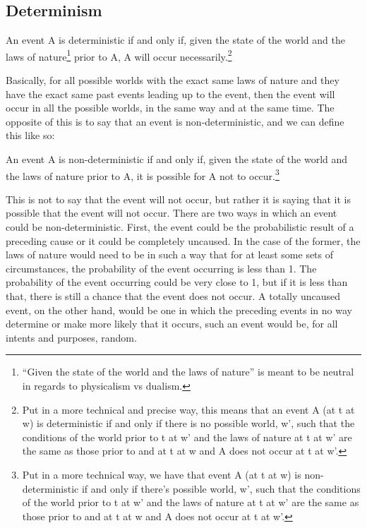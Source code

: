 \subsection{Determinism}
\begin{center}An event A is deterministic if and only if, given the state of the world and the laws of nature\footnote{“Given the state of the world and the laws of nature” is meant to be neutral in regards to physicalism vs dualism.}  prior to A, A will occur necessarily.\footnote{Put in a more technical and precise way, this means that an event A (at t at w) is deterministic if and only if there is no possible world, w’, such that the conditions of the world prior to t at w’ and the laws of nature at t at w’ are the same as those prior to and at t at w and A does not occur at t at w’.}\end{center} 
Basically, for all possible worlds with the exact same laws of nature and they have the exact same past events leading up to the event, then the event will occur in all the possible worlds, in the same way and at the same time. The opposite of this is to say that an event is non-deterministic, and we can define this like so:
\begin{center}An event A is non-deterministic if and only if, given the state of the world and the laws of nature prior to A, it is possible for A not to occur.\footnote{Put in a more technical way, we have that event A (at t at w) is non-deterministic if and only if there’s possible world, w’, such that the conditions of the world prior to t at w’ and the laws of nature at t at w’ are the same as those prior to and at t at w and A does not occur at t at w’.}\end{center} 
This is not to say that the event will not occur, but rather it is saying that it is possible that the event will not occur. There are two ways in which an event could be non-deterministic. First, the event could be the probabilistic result of a preceding cause or it could be completely uncaused. In the case of the former, the laws of nature would need to be in such a way that for at least some sets of circumstances, the probability of the event occurring is less than 1. The probability of the event occurring could be very close to 1, but if it is less than that, there is still a chance that the event does not occur. A totally uncaused event, on the other hand, would be one in which the preceding events in no way determine or make more likely that it occurs, such an event would be, for all intents and purposes, random.

